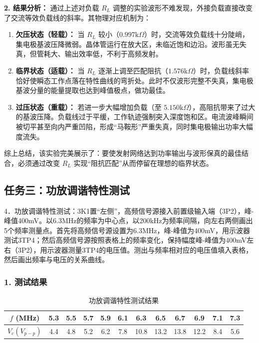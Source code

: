 \documentclass[12pt]{article}
\begin{document}
\textbf{2. 结果分析：}
通过上述对负载 $R_L$ 调整的实验波形不难发现，外接负载直接改变了交流等效负载线的斜率。其物理对应机制为：
\begin{enumerate}
    \item \textbf{欠压状态（轻载）：} 当 $R_L$ 较小（$0.997\text{k}\Omega$）时，交流等效负载线十分陡峭，集电极基波压降微弱。晶体管运行在放大区，未临近饱和边沿。波形虽无失真，但管耗大、输出效率低，不利于高频发射。
    \item \textbf{临界状态（适载）：} 当 $R_L$ 逐渐上调至匹配阻抗（$1.576\text{k}\Omega$）时，负载线斜率恰好使瞬态工作点落在特性曲线的弯折处。此时不仅波形完整不失真，集电极基波分量的能量提取也达到峰值极点，做功最佳。
    \item \textbf{过压状态（重载）：} 若进一步大幅增加负载（至 $5.150\text{k}\Omega$），高阻抗带来了过大的基波压降。负载线过于平缓，工作轨迹强制突入深度饱和区。电流波峰瞬间被切平甚至向内严重凹陷，形成“马鞍形”严重失真，同时集电极输出功率大幅度流失。
\end{enumerate}
综上总结，该实验完美展示了：要使发射网络达到功率输出与波形保真的最佳结合，必须通过改变 $R_L$ 实现“阻抗匹配”从而停留在理想的临界状态。

\subsection*{任务三：功放调谐特性测试}

4．功放调谐特性测试：3K1置“左侧”，高频信号源接入前置级输入端（3P2），峰-峰值400mV。以6.3MHz的频率为中心点，以200kHz为频率间隔，向左右两侧画出5个频率测量点。首先将高频信号源设置为6.3MHz，峰-峰值为400mV，用示波器测试3TP4；然后高频信号源按照表格上的频率变化，保持幅度峰-峰值为400mV左右（3P2），用示波器测量3TP4的电压值。测出与频率相对应的电压值填入表格，然后画出频率与电压的关系曲线。

\subsubsection*{1. 测试结果}

\begin{table}[H]
    \centering
    \begin{tabular}{c*{11}{c}}
    \toprule
    $f$ (MHz) & 5.3 & 5.5 & 5.7 & 5.9 & 6.1 & 6.3 & 6.5 & 6.7 & 6.9 & 7.1 & 7.3 \\
    \midrule
    $V_c (V_{p-p})$ & 4.4 & 4.8 & 5.2 & 6.2 & 7.8 & 10.8 & 13.2 & 13.8 & 12.2 & 8.4 & 5.6 \\
    \bottomrule
    \end{tabular}
    \caption{功放调谐特性测试结果}
\end{table}
\end{document}
